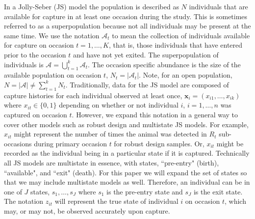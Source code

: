\documentclass[12pt]{article}
\newcommand{\bx}{\ensuremath{\mathbf{x}}}
\begin{document}
In a Jolly-Seber (JS) model the population is described as $N$ individuals that are available for capture in at least one occasion during the study. This is sometimes referred to as a superpopulation because not all individuals may be present at the same time. We use the notation $\mathcal{A}_t$ to mean the collection of individuals available for capture on occasion $t=1,\dots,K$, that is, those individuals that have entered prior to the occasion $t$ and have not yet exited. The superpopulation of individuals is $\mathcal{A} = \bigcup_{t=1}^k \mathcal{A}_t$. The occasion specific abundance is the size of the available population on occasion $t$, $N_t= |\mathcal{A}_t|$. Note, for an open population, $N = |\mathcal{A}| \ne \sum_{t=1}^k N_t$. Traditionally, data for the JS model are composed of capture histories for each individual observed at least once, $\bx_i = (x_{i1},\dots,x_{ik})$ where $x_{it} \in \{0,1\}$ depending on whether or not individual $i$, $i=1,\dots,n$ was captured on occasion $t$. However, we expand this notation in a general way to cover other models such as robust design and multistate JS models. For example, $x_{it}$ might represent the number of times the animal was detected in $R_t$ sub-occasions during primary occasion $t$ for robust design samples. Or, $x_{it}$ might be recorded as the individual being in a particular state if it is captured. Technically all JS models are multistate in essence, with states, ``pre-entry" (birth), ``available", and ``exit" (death). For this paper we will expand the set of states so that we may include multistate models \citep{xxx} as well. Therefore, an individual can be in one of $J$ states, $s_1,\dots,s_J$ where $s_1$ is the pre-entry state and $s_J$ is the exit state. The notation $z_{it}$ will represent the true state of individual $i$ on occasion $t$, which may, or may not, be observed accurately upon capture. 
\end{document}
